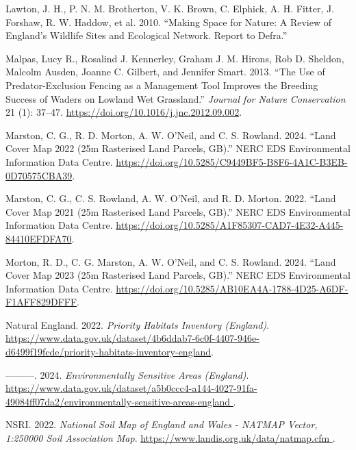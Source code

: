 \documentclass[
  12pt,
  letterpaper,
  DIV=11,
  numbers=noendperiod]{scrartcl}
\newlength{\cslhangindent}
\newenvironment{CSLReferences}[2] %
 {\begin{list}{}{%
  \setlength{\itemindent}{0pt}
  \setlength{\leftmargin}{0pt}
  \setlength{\parsep}{0pt}
  \ifodd #1
   \setlength{\leftmargin}{\cslhangindent}
   \setlength{\itemindent}{-1\cslhangindent}
  \fi
  \setlength{\itemsep}{#2\baselineskip}}}
 {\end{list}}
\begin{document}
\begin{CSLReferences}{1}{0}
Lawton, J. H., P. N. M. Brotherton, V. K. Brown, C. Elphick, A. H.
Fitter, J. Forshaw, R. W. Haddow, et al. 2010. {``Making Space for
Nature: A Review of England's Wildlife Sites and Ecological Network.
Report to Defra.''}

Malpas, Lucy R., Rosalind J. Kennerley, Graham J. M. Hirons, Rob D.
Sheldon, Malcolm Ausden, Joanne C. Gilbert, and Jennifer Smart. 2013.
{``The Use of Predator-Exclusion Fencing as a Management Tool Improves
the Breeding Success of Waders on Lowland Wet Grassland.''}
\emph{Journal for Nature Conservation} 21 (1): 37--47.
\url{https://doi.org/10.1016/j.jnc.2012.09.002}.

Marston, C. G., R. D. Morton, A. W. O'Neil, and C. S. Rowland. 2024.
{``Land Cover Map 2022 (25m Rasterised Land Parcels, GB).''} NERC EDS
Environmental Information Data Centre.
\url{https://doi.org/10.5285/C9449BF5-B8F6-4A1C-B3EB-0D70575CBA39}.

Marston, C. G., C. S. Rowland, A. W. O'Neil, and R. D. Morton. 2022.
{``Land Cover Map 2021 (25m Rasterised Land Parcels, GB).''} NERC EDS
Environmental Information Data Centre.
\url{https://doi.org/10.5285/A1F85307-CAD7-4E32-A445-84410EFDFA70}.

Morton, R. D., C. G. Marston, A. W. O'Neil, and C. S. Rowland. 2024.
{``Land Cover Map 2023 (25m Rasterised Land Parcels, GB).''} NERC EDS
Environmental Information Data Centre.
\url{https://doi.org/10.5285/AB10EA4A-1788-4D25-A6DF-F1AFF829DFFF}.

Natural England. 2022. \emph{Priority Habitats Inventory (England)}.
\url{https://www.data.gov.uk/dataset/4b6ddab7-6c0f-4407-946e-d6499f19fcde/priority-habitats-inventory-england}.

---------. 2024. \emph{Environmentally Sensitive Areas (England)}.
\href{https://www.data.gov.uk/dataset/a5b0ccc4-a144-4027-91fa-49084ff07da2/environmentally-sensitive-areas-england\%20}{https://www.data.gov.uk/dataset/a5b0ccc4-a144-4027-91fa-49084ff07da2/environmentally-sensitive-areas-england
}.

NSRI. 2022. \emph{National Soil Map of England and Wales - NATMAP
Vector, 1:250000 Soil Association Map}.
\href{https://www.landis.org.uk/data/natmap.cfm\%20}{https://www.landis.org.uk/data/natmap.cfm
}.


\end{CSLReferences}
\end{document}
